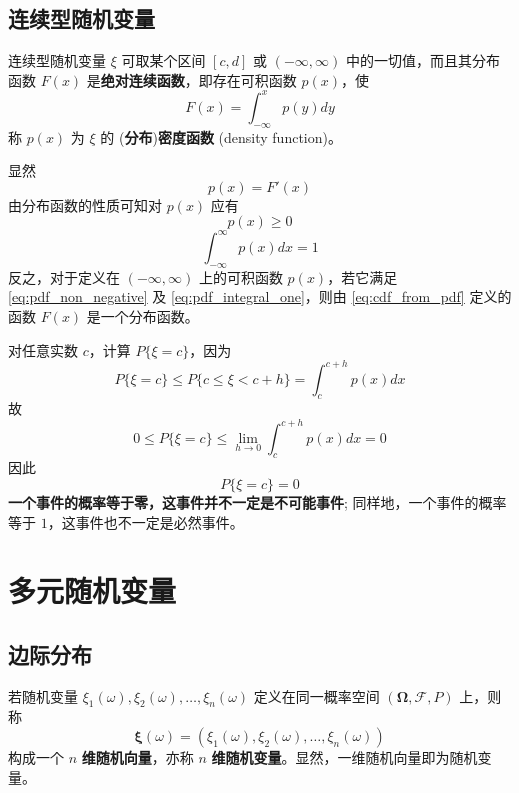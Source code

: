 \subsection{连续型随机变量}\label{subsec:连续型随机变量}
\begin{definition}[分布密度函数]\label{def:pdf}
    连续型随机变量 $\xi$ 可取某个区间 $[c,d]$ 或 $(-\infty,\infty)$ 中的一切值，而且其分布函数 $F(x)$ 是\textbf{绝对连续函数}，即存在可积函数 $p(x)$，使
\begin{equation} \label{eq:cdf_from_pdf}
F(x) = \int_{-\infty}^x p(y) dy
\end{equation}
称 $p(x)$ 为 $\xi$ 的 (\textbf{分布})\textbf{密度函数} (density function)。
\end{definition}
\begin{remark}
    显然
\begin{equation} \label{eq:pdf_from_cdf}
p(x) = F'(x)
\end{equation}
由分布函数的性质可知对 $p(x)$ 应有
\begin{equation} \label{eq:pdf_non_negative}
p(x)\ge 0
\end{equation}
\begin{equation} \label{eq:pdf_integral_one}
\int_{-\infty}^\infty p(x) dx = 1
\end{equation}
反之，对于定义在 $(-\infty,\infty)$ 上的可积函数 $p(x)$，若它满足 \eqref{eq:pdf_non_negative} 及 \eqref{eq:pdf_integral_one}，则由 \eqref{eq:cdf_from_pdf} 定义的函数 $F(x)$ 是一个分布函数。
\end{remark}
\begin{remark}
    对任意实数 $c$，计算 $P\{ \xi=c \}$，因为
\[
P\{ \xi=c \} \le P\{ c \le \xi < c+h \} = \int_c^{c+h} p(x)dx
\]
故
\[
0 \le P\{ \xi=c \} \le \lim_{h\to 0} \int_c^{c+h} p(x)dx = 0
\]
因此
\[
P\{ \xi=c \} = 0
\]
\textbf{一个事件的概率等于零，这事件并不一定是不可能事件}; 同样地，一个事件的概率等于 $1$，这事件也不一定是必然事件。
\end{remark}

\section{多元随机变量}\label{sec:多元随机变量}
\subsection{边际分布}\label{subsec:边际分布}
\begin{definition}[n维随机变量] \label{def:n_dimensional_random_vector}
若随机变量 $\xi_1(\omega),\xi_2(\omega),\ldots,\xi_n(\omega)$ 定义在同一概率空间 $(\boldsymbol{\Omega},\mathcal{F},P)$ 上，则称
\begin{equation} \label{eq:n_dimensional_random_vector}
\boldsymbol{\xi}(\omega) = (\xi_1(\omega),\xi_2(\omega),\ldots,\xi_n(\omega))
\end{equation}
构成一个 $n$ \textbf{维随机向量}，亦称 $n$ \textbf{维随机变量}。显然，一维随机向量即为随机变量。
\end{definition}

